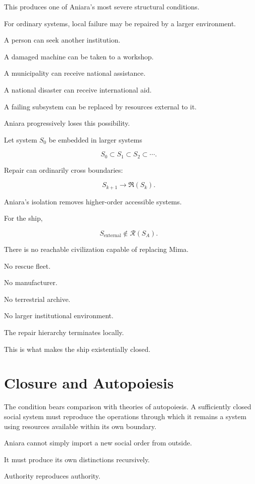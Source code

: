 \documentclass[11pt,oneside]{book}
\theoremstyle{definition}
\theoremstyle{remark}
\newcommand{\R}{\mathcal{R}}
\newcommand{\Repair}{\mathfrak{R}}
\begin{document}
This produces one of Aniara's most severe structural conditions.

For ordinary systems, local failure may be repaired by a larger environment.

A person can seek another institution.

A damaged machine can be taken to a workshop.

A municipality can receive national assistance.

A national disaster can receive international aid.

A failing subsystem can be replaced by resources external to it.

Aniara progressively loses this possibility.

Let system \(S_0\) be embedded in larger systems

\[
S_0\subset S_1\subset S_2\subset\cdots.
\]

Repair can ordinarily cross boundaries:

\[
S_{k+1}\rightarrow\Repair(S_k).
\]

Aniara's isolation removes higher-order accessible systems.

For the ship,

\[
S_{\mathrm{external}}
\notin\R(S_A).
\]

There is no reachable civilization capable of replacing Mima.

No rescue fleet.

No manufacturer.

No terrestrial archive.

No larger institutional environment.

The repair hierarchy terminates locally.

This is what makes the ship existentially closed.

\section{Closure and Autopoiesis}

The condition bears comparison with theories of autopoiesis. A sufficiently closed social system must reproduce the operations through which it remains a system using resources available within its own boundary.

Aniara cannot simply import a new social order from outside.

It must produce its own distinctions recursively.

Authority reproduces authority.
\end{document}
